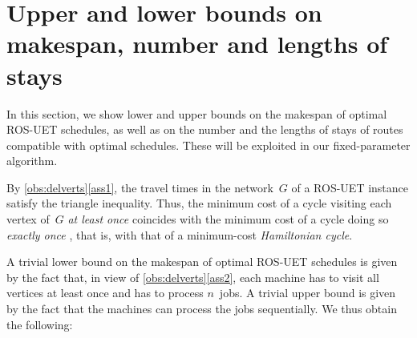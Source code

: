 \documentclass[natbib,sort,smallextended,envcountsame,envcountsect,numbook]{svjour3}
\newcommand{\HC}{H}
\newcommand{\bigO}{O}
\newcommand{\ROS}{\textsc{ROS}}
\newcommand{\ROSUPT}{\textsc{ROS-UET}}
\newcommand{\njobs}{n}
\newcommand{\nmach}{m}
\newcommand{\Gr}{G}
\begin{document}


\section{Upper and lower bounds on makespan, number and lengths of stays}\label{sec:ubo}
\noindent
In this section,
we show lower and upper bounds on the makespan
of optimal \ROSUPT{} schedules,
as well as
on the number and the lengths of stays
of routes compatible with optimal schedules.
These will be exploited
in our fixed-parameter algorithm.


By \cref{obs:delverts}\eqref{ass1},
the travel times in the network~\(G\) of a \ROSUPT{} instance
satisfy the triangle inequality.
Thus, the minimum cost of a cycle
visiting each vertex of~\(\Gr\) \emph{at least once}
coincides with the minimum cost of a cycle
doing so \emph{exactly once} \citep{Ser78},
that is, with that of a minimum-cost \emph{Hamiltonian cycle}.

A trivial lower bound
on the makespan of optimal \ROSUPT{} schedules
is given by the fact that,
in view of \cref{obs:delverts}\eqref{ass2},
each machine has to visit
all vertices at least once
and has to process $\njobs$~jobs.
A trivial upper bound is given by
the fact that the machines can process the jobs sequentially.
We thus obtain the following:
\end{document}
